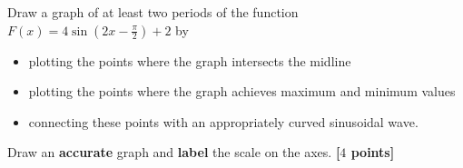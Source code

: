 \newpage

\begin{problem}
  Draw a graph of at least two periods of the function $F(x) = 4\sin
  \left(2x - \frac{\pi}{2}\right) + 2$ by
  \begin{itemize}
    \item plotting the points where the graph intersects the midline
    \item plotting the points where the graph achieves maximum and minimum
      values
    \item connecting these points with an appropriately curved sinusoidal wave.
  \end{itemize}
  Draw an \textbf{accurate} graph and \textbf{label} the scale on the axes.
  \textbf{[$4$ points]}
\end{problem}

\begin{solution}
  \begin{figure}[htpb]
    \centering
    \caption{}
    \label{fig:week_3}
  \end{figure}
\end{solution}

